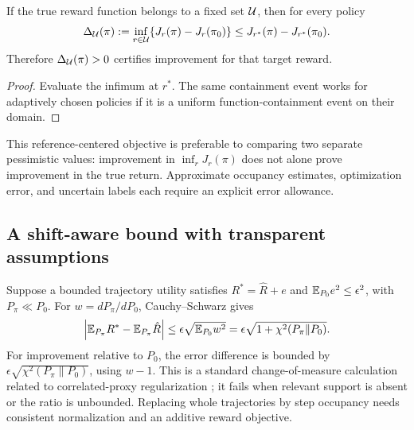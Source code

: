 \begin{proposition}
If the true reward function belongs to a fixed set $\mathcal{U}$, then for every policy
\[
 \Delta_{\mathcal{U}}(\pi):=\inf_{r\in\mathcal{U}}\{J_r(\pi)-J_r(\pi_0)\}
 \le J_{r^*}(\pi)-J_{r^*}(\pi_0).
\]
Therefore $\Delta_{\mathcal{U}}(\pi)>0$ certifies improvement for that target reward.
\end{proposition}
\begin{proof}
Evaluate the infimum at $r^*$. The same containment event works for adaptively
chosen policies if it is a uniform function-containment event on their domain.
\end{proof}
This reference-centered objective is preferable to comparing two separate
pessimistic values: improvement in $\inf_rJ_r(\pi)$ does not alone prove
improvement in the true return. Approximate occupancy estimates, optimization
error, and uncertain labels each require an explicit error allowance.

\subsection{A shift-aware bound with transparent assumptions}
Suppose a bounded trajectory utility satisfies $R^*=\hat R+e$ and
$\mathbb{E}_{P_0}e^2\le\epsilon^2$, with $P_\pi\ll P_0$.
For $w=dP_\pi/dP_0$, Cauchy--Schwarz gives
\[
 \left|\mathbb{E}_{P_\pi}R^*-\mathbb{E}_{P_\pi}\hat R\right|
 \le\epsilon\sqrt{\mathbb{E}_{P_0}w^2}
 =\epsilon\sqrt{1+\chi^2(P_\pi\|P_0)}.
\]
For improvement relative to $P_0$, the error difference is bounded by
$\epsilon\sqrt{\chi^2(P_\pi\|P_0)}$, using $w-1$.
This is a standard change-of-measure calculation related to correlated-proxy
regularization \cite{correlated}; it fails when relevant support is absent or
the ratio is unbounded. Replacing whole trajectories by step occupancy needs
consistent normalization and an additive reward objective.

